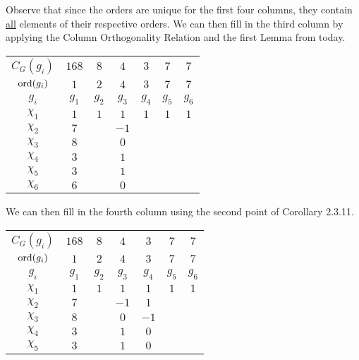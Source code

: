 \begin{boxexample}[Constructing the Character Table of $G = \PSL{2, 7}$]
\begin{table}[H]
\begin{tabular}{|c|cccccc|}
        \end{tabular}
    \end{table}
    Observe that since the orders are unique for the first four columns, they contain \underline{all} elements of their respective orders. We can then fill in the third column by applying the Column Orthogonality Relation and the first Lemma from today. %
    \begin{table}[H]
        \centering
        \begin{tabular}{|c|cccccc|}
            $C_G(g_i)$ & $168$ & $8$ & $4$ & $3$ & $7$ & $7$ \\
            $\operatorname{ord}\!\left( g_i \right)$ & $1$ & $2$ & $4$ & $3$ & $7$ & $7$ \\
            $g_i$ & $g_1$ & $g_2$ & $g_3$ & $g_4$ & $g_5$ & $g_6$ \\
            \hline
            $\chi_1$ & $1$ & $1$ & $1$ & $1$ & $1$ & $1$ \\
            $\chi_2$ & $7$ & & $-1$ & & & \\
            $\chi_3$ & $8$ & & $0$ & & & \\
            $\chi_4$ & $3$ & & $1$ & & & \\
            $\chi_5$ & $3$ & & $1$ & & & \\
            $\chi_6$ & $6$ & & $0$ & & & \\
        \end{tabular}
    \end{table}
    We can then fill in the fourth column using the second point of Corollary 2.3.11. %
    \begin{table}[H]
        \centering
        \begin{tabular}{|c|cccccc|}
            $C_G(g_i)$ & $168$ & $8$ & $4$ & $3$ & $7$ & $7$ \\
            $\operatorname{ord}\!\left( g_i \right)$ & $1$ & $2$ & $4$ & $3$ & $7$ & $7$ \\
            $g_i$ & $g_1$ & $g_2$ & $g_3$ & $g_4$ & $g_5$ & $g_6$ \\
            \hline
            $\chi_1$ & $1$ & $1$ & $1$ & $1$ & $1$ & $1$ \\
            $\chi_2$ & $7$ & & $-1$ & $1$ & & \\
            $\chi_3$ & $8$ & & $0$ & $-1$ & & \\
            $\chi_4$ & $3$ & & $1$ & $0$ & & \\
            $\chi_5$ & $3$ & & $1$ & $0$ & & \\

\end{tabular}
\end{table}
\end{boxexample}
